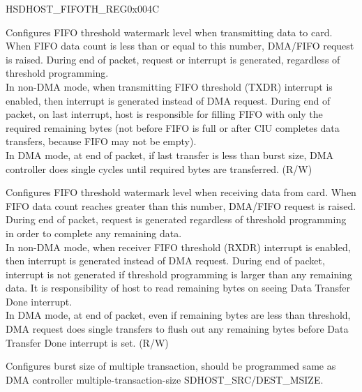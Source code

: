 \begin{register}{H}{SDHOST\_FIFOTH\_REG}{0x004C}\label{regdesc:SDHOSTFIFOTHREG}
%
%
%
%
%
%
\regnewline%
\begin{regdesc}\begin{reglist}
\label{fielddesc:SDHOSTTXWMARK}\item [SDHOST\_TX\_WMARK] Configures FIFO threshold watermark level when transmitting data to card. When FIFO data count is less than or equal to this number, DMA/FIFO request is raised. During end of packet, request or interrupt is generated, regardless of threshold programming.\\
In non-DMA mode, when transmitting FIFO threshold (TXDR) interrupt is enabled, then interrupt is generated instead of DMA request. During end of packet, on last interrupt, host is responsible for filling FIFO with only the required remaining bytes (not before FIFO is full or after CIU completes data transfers, because FIFO may not be empty).\\
In DMA mode, at end of packet, if last transfer is less than burst size, DMA controller does single cycles until required bytes are transferred. (R/W)
\label{fielddesc:SDHOSTRXWMARK}\item [SDHOST\_RX\_WMARK] Configures FIFO threshold watermark level when receiving data from card. When FIFO data count reaches greater than this number, DMA/FIFO request is raised. During end of packet, request is generated regardless of threshold programming in order to complete any remaining data.\\
In non-DMA mode, when receiver FIFO threshold (RXDR) interrupt is enabled, then interrupt is generated instead of DMA request. During end of packet, interrupt is not generated if threshold programming is larger than any remaining data. It is responsibility of host to read remaining bytes on seeing Data Transfer Done interrupt.\\
In DMA mode, at end of packet, even if remaining bytes are less than threshold, DMA request does single transfers to flush out any remaining bytes before Data Transfer Done interrupt is set. (R/W)
\label{fielddesc:SDHOSTDMAMULTIPLETRANSACTIONSIZE}\item [SDHOST\_DMA\_MULTIPLE\_TRANSACTION\_SIZE] Configures burst size of multiple transaction, should be programmed same as DMA controller multiple-transaction-size SDHOST\_SRC/DEST\_MSIZE.\\

\end{reglist}
\end{regdesc}
\end{register}
